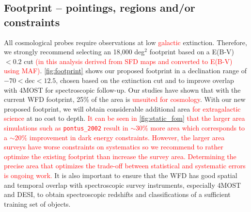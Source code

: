 \documentclass[12pt, letterpaper]{article}
\newcommand{\review}[1]{{\textcolor{red}{#1}}}
\begin{document}
\subsection{Footprint -- pointings, regions and/or constraints}
\label{sec:footprint}
All cosmological probes require observations at low \review{galactic} extinction. Therefore, we strongly recommend selecting an 18,000 deg$^2$  footprint based on a E(B-V)$<0.2$ cut \review{(in this analysis derived from SFD maps and converted to E(B-V) using MAF)}. \autoref{fig:footprint} shows our proposed footprint in a declination range of $-70<$dec$<12.5$, chosen based on the extinction cut and to improve overlap with 4MOST for spectroscopic follow-up. Our studies have shown that with the current WFD footprint, 25\% of the area is \review{unsuited for cosmology}. With our new proposed footprint, we will obtain considerable additional area \review{for extragalactic science} at no cost to depth. \review{It can be seen in \autoref{fig:static_fom} that the larger area simulations such as \texttt{pontus\_2002} result in $\sim30\%$ more area which corresponds to a $\sim20\%$ improvement in dark energy constraints. However, the larger area surveys have worse constraints on systematics so we recommend to rather optimize the existing footprint than increase the survey area. Determining the precise area that optimizes the trade-off between statistical and systematic errors is ongoing work.} It is also important to ensure that the WFD has good spatial and temporal 
overlap with spectroscopic survey instruments, especially 4MOST and DESI, to obtain spectroscopic redshifts and classifications of a sufficient training set of objects.\\ 
\end{document}

